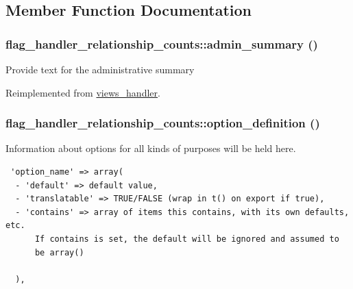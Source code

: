 \subsection{Member Function Documentation}
\hypertarget{classflag__handler__relationship__counts_69a8b8c5c2a4ffa37f3cded6990716b2}{
\subsubsection[{admin\_\-summary}]{\setlength{\rightskip}{0pt plus 5cm}flag\_\-handler\_\-relationship\_\-counts::admin\_\-summary ()}}
\label{classflag__handler__relationship__counts_69a8b8c5c2a4ffa37f3cded6990716b2}


Provide text for the administrative summary 

Reimplemented from \hyperlink{classviews__handler_27a5cb35f3f17322957730a95b6be11e}{views\_\-handler}.\hypertarget{classflag__handler__relationship__counts_d72acb678e22ecdaeb867b89f051863e}{
\subsubsection[{option\_\-definition}]{\setlength{\rightskip}{0pt plus 5cm}flag\_\-handler\_\-relationship\_\-counts::option\_\-definition ()}}
\label{classflag__handler__relationship__counts_d72acb678e22ecdaeb867b89f051863e}


Information about options for all kinds of purposes will be held here. 

\begin{Code}\begin{verbatim} 'option_name' => array(
  - 'default' => default value,
  - 'translatable' => TRUE/FALSE (wrap in t() on export if true),
  - 'contains' => array of items this contains, with its own defaults, etc.
      If contains is set, the default will be ignored and assumed to
      be array()

  ),
\end{verbatim}
\end{Code}

